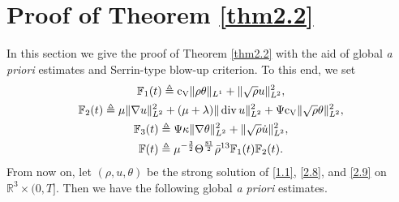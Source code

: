 \documentclass[11pt]{article}
\DeclareMathOperator{\divv}{div}
\begin{document}
\section{Proof of Theorem \ref{thm2.2}}\label{sec5}

In this section we give the proof of Theorem \ref{thm2.2} with the aid of global {\it a priori} estimates and Serrin-type blow-up criterion.
To this end, we set
\begin{gather}
\mathbb{F}_1 (t) \triangleq {\rm c_V} \|\rho \theta \|_{L^1} + \|\sqrt \rho u\|_{L^2}^2,\notag
\\
\mathbb{F}_2 (t)
\triangleq \mu \|\nabla u\|_{L^2}^2 + (\mu + \lambda ) \|\divv u\|_{L^2}^2 + \Psi {\rm c_V} \|\sqrt \rho \theta \|_{L^2}^2,\notag
\\
\mathbb{F}_3 (t)
\triangleq \Psi \kappa \|\nabla \theta\|_{L^2}^2 + \|\sqrt{\rho} \dot{u}\|_{L^2}^2,\notag
\\
\mathbb{F} (t) \triangleq \mu^{-\frac{3}{2}} \Theta^{\frac{81}{2}} \bar{\rho}^{13} \mathbb{F}_1(t) \mathbb{F}_2 (t).\notag
\end{gather}
From now on, let $(\rho,u,\theta )$ be the strong solution of \eqref{1.1}, \eqref{2.8}, and \eqref{2.9} on $\mathbb{R}^3 \times (0,T]$. Then we have the following global {\it a priori} estimates.
\end{document}
